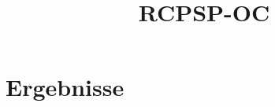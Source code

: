 \documentclass{scrartcl}
\title{RCPSP-OC}
\date{}
\begin{document}
\setlength\extrarowheight{5pt}
\section{Ergebnisse}
%

\end{document}
